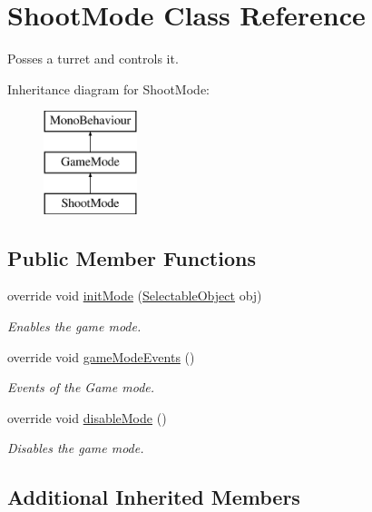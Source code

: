 \hypertarget{class_shoot_mode}{}\section{Shoot\+Mode Class Reference}
\label{class_shoot_mode}


Posses a turret and controls it.  


Inheritance diagram for Shoot\+Mode\+:\begin{figure}[H]
\begin{center}
\leavevmode
\includegraphics[height=3.000000cm]{class_shoot_mode}
\end{center}
\end{figure}
\subsection*{Public Member Functions}
\begin{DoxyCompactItemize}
\item 
override void \mbox{\hyperlink{class_shoot_mode_ac89bf282dbd0cb303ca249b6e45b3507}{init\+Mode}} (\mbox{\hyperlink{class_selectable_object}{Selectable\+Object}} obj)
\begin{DoxyCompactList}\small\item\em Enables the game mode. \end{DoxyCompactList}\item 
override void \mbox{\hyperlink{class_shoot_mode_a3c9ab9c7883d23161205abebbc233c13}{game\+Mode\+Events}} ()
\begin{DoxyCompactList}\small\item\em Events of the Game mode. \end{DoxyCompactList}\item 
override void \mbox{\hyperlink{class_shoot_mode_a172531ba502bfea3d75404e1c890db6b}{disable\+Mode}} ()
\begin{DoxyCompactList}\small\item\em Disables the game mode. \end{DoxyCompactList}\end{DoxyCompactItemize}
\subsection*{Additional Inherited Members}


